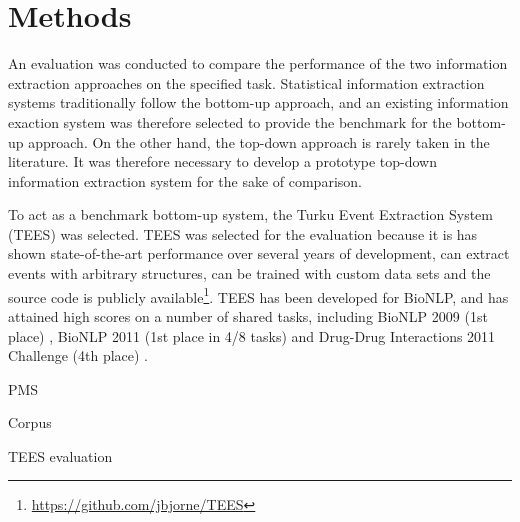\section{Methods}

An evaluation was conducted to compare the performance of the two information extraction approaches on the specified task. Statistical information extraction systems traditionally follow the bottom-up approach, and an existing information exaction system was therefore selected to provide the benchmark for the bottom-up approach. On the other hand, the top-down approach is rarely taken in the literature. It was therefore necessary to develop a prototype top-down information extraction system for the sake of comparison.

To act as a benchmark bottom-up system, the Turku Event Extraction System (TEES) \citep{bjö11ddi} was selected. TEES was selected for the evaluation because it is has shown state-of-the-art performance over several years of development, can extract events with arbitrary structures, can be trained with custom data sets and the source code is publicly available\footnote{\url{https://github.com/jbjorne/TEES}}. TEES has been developed for BioNLP, and has attained high scores on a number of shared tasks, including BioNLP 2009 (1st place) \citep{bjö09}, BioNLP 2011 (1st place in 4/8 tasks) \citep{bjö11} and Drug-Drug Interactions 2011 Challenge (4th place) \citep{bjö11ddi}.

PMS

Corpus

TEES evaluation